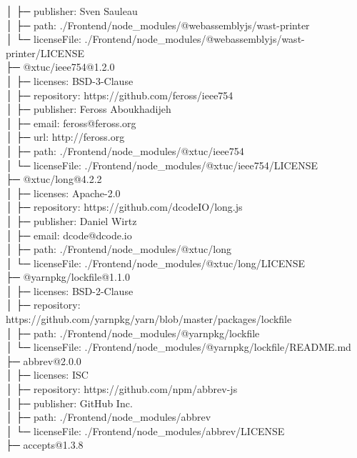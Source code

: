 \documentclass[
    paper=a4,
    twoside=false,
    parskip=half,
    listof=entryprefix,
    listof=totoc,
    index=totoc,
    bibliography=totoc,
    headsepline,
]{scrbook}
\begin{document}
    │  ├─ publisher: Sven Sauleau\\
    │  ├─ path: ./Frontend/node\_modules/@webassemblyjs/wast-printer\\
    │  └─ licenseFile: ./Frontend/node\_modules/@webassemblyjs/wast-printer/LICENSE\\
    ├─ @xtuc/ieee754@1.2.0\\
    │  ├─ licenses: BSD-3-Clause\\
    │  ├─ repository: https://github.com/feross/ieee754\\
    │  ├─ publisher: Feross Aboukhadijeh\\
    │  ├─ email: feross@feross.org\\
    │  ├─ url: http://feross.org\\
    │  ├─ path: ./Frontend/node\_modules/@xtuc/ieee754\\
    │  └─ licenseFile: ./Frontend/node\_modules/@xtuc/ieee754/LICENSE\\
    ├─ @xtuc/long@4.2.2\\
    │  ├─ licenses: Apache-2.0\\
    │  ├─ repository: https://github.com/dcodeIO/long.js\\
    │  ├─ publisher: Daniel Wirtz\\
    │  ├─ email: dcode@dcode.io\\
    │  ├─ path: ./Frontend/node\_modules/@xtuc/long\\
    │  └─ licenseFile: ./Frontend/node\_modules/@xtuc/long/LICENSE\\
    ├─ @yarnpkg/lockfile@1.1.0\\
    │  ├─ licenses: BSD-2-Clause\\
    │  ├─ repository: https://github.com/yarnpkg/yarn/blob/master/packages/lockfile\\
    │  ├─ path: ./Frontend/node\_modules/@yarnpkg/lockfile\\
    │  └─ licenseFile: ./Frontend/node\_modules/@yarnpkg/lockfile/README.md\\
    ├─ abbrev@2.0.0\\
    │  ├─ licenses: ISC\\
    │  ├─ repository: https://github.com/npm/abbrev-js\\
    │  ├─ publisher: GitHub Inc.\\
    │  ├─ path: ./Frontend/node\_modules/abbrev\\
    │  └─ licenseFile: ./Frontend/node\_modules/abbrev/LICENSE\\
    ├─ accepts@1.3.8\\
\end{document}
